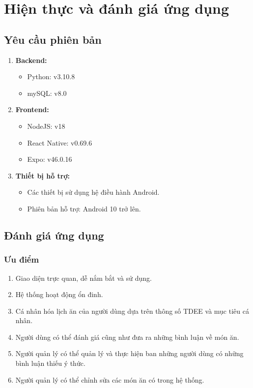 \section{Hiện thực và đánh giá ứng dụng}
    \subsection{Yêu cầu phiên bản}
        \begin{enumerate}
            \item \textbf{Backend:}
            \begin{itemize}
                \item Python: v3.10.8
                \item mySQL: v8.0
            \end{itemize}

            \item \textbf{Frontend:}
            \begin{itemize}
                \item NodeJS: v18
                \item React Native: v0.69.6
                \item Expo: v46.0.16
            \end{itemize}

            \item \textbf{Thiết bị hỗ trợ:}
            \begin{itemize}
                \item Các thiết bị sử dụng hệ điều hành Android.
                \item Phiên bản hỗ trợ: Android 10 trở lên.
            \end{itemize}
        \end{enumerate}

    \subsection{Đánh giá ứng dụng}
        \subsubsection{Ưu điểm}
        \begin{enumerate}
            \item Giao diện trực quan, dễ nắm bắt và sử dụng.
            \item Hệ thống hoạt động ổn đinh.
            \item Cá nhân hóa lịch ăn của người dùng dựa trên thông số TDEE và mục tiêu cá nhân.
            \item Người dùng có thể đánh giá cũng như đưa ra những bình luận về món ăn.
            \item Người quản lý có thể quản lý và thực hiện ban những người dùng có những bình luận thiếu ý thức.
            \item Người quản lý có thể chỉnh sửa các món ăn có trong hệ thống.
        \end{enumerate}

